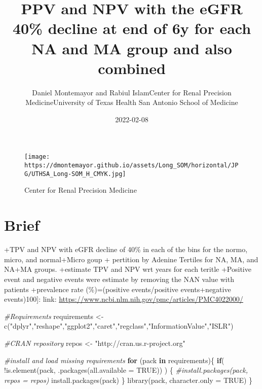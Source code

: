 \documentclass[
]{article}
\title{PPV and NPV with the eGFR 40\% decline at end of 6y for each NA
and MA group and also combined}
\author{Daniel Montemayor and Rabiul IslamCenter for Renal Precision
MedicineUniversity of Texas Health San Antonio School of Medicine}
\date{2022-02-08}
\newenvironment{Shaded}{\begin{snugshade}}{\end{snugshade}}
\newcommand{\AttributeTok}[1]{\textcolor[rgb]{0.77,0.63,0.00}{#1}}
\newcommand{\CommentTok}[1]{\textcolor[rgb]{0.56,0.35,0.01}{\textit{#1}}}
\newcommand{\ConstantTok}[1]{\textcolor[rgb]{0.00,0.00,0.00}{#1}}
\newcommand{\ControlFlowTok}[1]{\textcolor[rgb]{0.13,0.29,0.53}{\textbf{#1}}}
\newcommand{\FunctionTok}[1]{\textcolor[rgb]{0.00,0.00,0.00}{#1}}
\newcommand{\NormalTok}[1]{#1}
\newcommand{\OtherTok}[1]{\textcolor[rgb]{0.56,0.35,0.01}{#1}}
\newcommand{\SpecialCharTok}[1]{\textcolor[rgb]{0.00,0.00,0.00}{#1}}
\newcommand{\StringTok}[1]{\textcolor[rgb]{0.31,0.60,0.02}{#1}}
\begin{document}
\maketitle

{
\setcounter{tocdepth}{3}
\tableofcontents
}
\begin{figure}
\centering
\texttt{[image: https://dmontemayor.github.io/assets/Long\_SOM/horizontal/JPG/UTHSA\_Long-SOM\_H\_CMYK.jpg]}
\caption{Center for Renal Precision Medicine}
\end{figure}

\hypertarget{brief}{%
\section{Brief}\label{brief}}

+TPV and NPV with eGFR decline of 40\% in each of the bins for the
normo, micro, and normal+Micro goup + pertition by Adenine Tertiles for
NA, MA, and NA+MA groups. +estimate TPV and NPV wrt years for each
teritle +Positive event and negative events were estimate by removing
the NAN value with patients +prevalence rate (\%)=(positive
events/positive events+negative events)100{]}: link:
\url{https://www.ncbi.nlm.nih.gov/pmc/articles/PMC4022000/}

\begin{Shaded}
\end{Shaded}

\begin{Shaded}
\begin{Highlighting}[]
\CommentTok{\#Requirements}
\NormalTok{requirements }\OtherTok{\textless{}{-}} \FunctionTok{c}\NormalTok{(}\StringTok{"dplyr"}\NormalTok{,}\StringTok{"reshape"}\NormalTok{,}\StringTok{"ggplot2"}\NormalTok{,}\StringTok{"caret"}\NormalTok{,}\StringTok{"regclass"}\NormalTok{,}\StringTok{"InformationValue"}\NormalTok{,}\StringTok{"ISLR"}\NormalTok{)}

\CommentTok{\#CRAN repository}
\NormalTok{repos }\OtherTok{\textless{}{-}} \StringTok{"http://cran.us.r{-}project.org"}

\CommentTok{\#install and load missing requirements}
\ControlFlowTok{for}\NormalTok{ (pack }\ControlFlowTok{in}\NormalTok{ requirements)\{}
  \ControlFlowTok{if}\NormalTok{( }\SpecialCharTok{!}\FunctionTok{is.element}\NormalTok{(pack, }\FunctionTok{.packages}\NormalTok{(}\AttributeTok{all.available =} \ConstantTok{TRUE}\NormalTok{)) ) \{}
    \CommentTok{\#install.packages(pack, repos = repos)}
    \FunctionTok{install.packages}\NormalTok{(pack)}
\NormalTok{  \}}
  \FunctionTok{library}\NormalTok{(pack, }\AttributeTok{character.only =} \ConstantTok{TRUE}\NormalTok{)}
\NormalTok{\}}
\end{Highlighting}
\end{Shaded}
\end{document}
